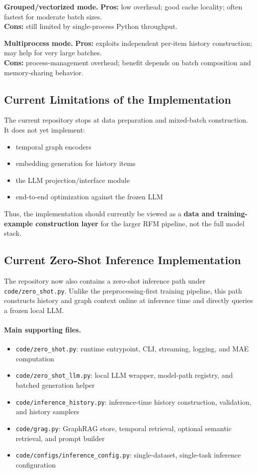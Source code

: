 \documentclass[11pt]{article}
\begin{document}
\textbf{Grouped/vectorized mode.}
\textbf{Pros:} low overhead; good cache locality; often fastest for moderate batch sizes.\\
\textbf{Cons:} still limited by single-process Python throughput.

\textbf{Multiprocess mode.}
\textbf{Pros:} exploits independent per-item history construction; may help for very large batches.\\
\textbf{Cons:} process-management overhead; benefit depends on batch composition and memory-sharing behavior.

\subsection{Current Limitations of the Implementation}

The current repository stops at data preparation and mixed-batch construction. It does not yet implement:
\begin{itemize}
\item temporal graph encoders
\item embedding generation for history items
\item the LLM projection/interface module
\item end-to-end optimization against the frozen LLM
\end{itemize}

Thus, the implementation should currently be viewed as a \textbf{data and training-example construction layer} for the larger RFM pipeline, not the full model stack.

\subsection{Current Zero-Shot Inference Implementation}

The repository now also contains a zero-shot inference path under \texttt{code/zero\_shot.py}. Unlike the preprocessing-first training pipeline, this path constructs history and graph context online at inference time and directly queries a frozen local LLM.

\paragraph{Main supporting files.}
\begin{itemize}
\item \texttt{code/zero\_shot.py}: runtime entrypoint, CLI, streaming, logging, and MAE computation
\item \texttt{code/zero\_shot\_llm.py}: local LLM wrapper, model-path registry, and batched generation helper
\item \texttt{code/inference\_history.py}: inference-time history construction, validation, and history samplers
\item \texttt{code/grag.py}: GraphRAG store, temporal retrieval, optional semantic retrieval, and prompt builder
\item \texttt{code/configs/inference\_config.py}: single-dataset, single-task inference configuration
\end{itemize}
\end{document}
